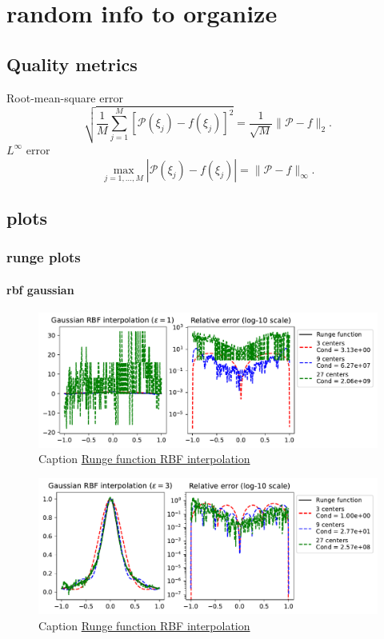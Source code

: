 \documentclass[12pt]{report} %
\begin{document}
\chapter{random info to organize}
\section{Quality metrics}

Root-mean-square error
\[ \sqrt{\frac{1}{M} \sum_{j = 1}^M [\mathcal{P} (\xi_j) - f (\xi_j)]^2} =
   \frac{1}{\sqrt{M}} \| \mathcal{P}- f \|_2 . \]
$L^{\infty}$ error
\[ \max_{j = 1, \ldots, M} | \mathcal{P} (\xi_j) - f (\xi_j) | = \|
   \mathcal{P}- f \|_{\infty} . \]

\section{plots}
\subsection{runge plots}

\subsubsection{rbf gaussian}

\begin{figure}[ht]
    \centering
    \includegraphics[width=\textwidth]{imagenes/rbf_interpolation/rbf_runge_1.pdf}
    \caption{Caption \href{https://github.com/heqro/tfm-experiments/blob/main/introductory_notebooks/rbf_interpolation/runge_phs.ipynb}{Runge function RBF interpolation}}
    \label{fig:rbf-runge-phenomenon-eps-1}
\end{figure}

\begin{figure}[ht]
    \centering
    \includegraphics[width=\textwidth]{imagenes/rbf_interpolation/rbf_runge_3.pdf}
    \caption{Caption \href{https://github.com/heqro/tfm-experiments/blob/main/introductory_notebooks/rbf_interpolation/runge_phs.ipynb}{Runge function RBF interpolation}}
    \label{fig:rbf-runge-phenomenon-eps-3}
\end{figure}
\end{document}
